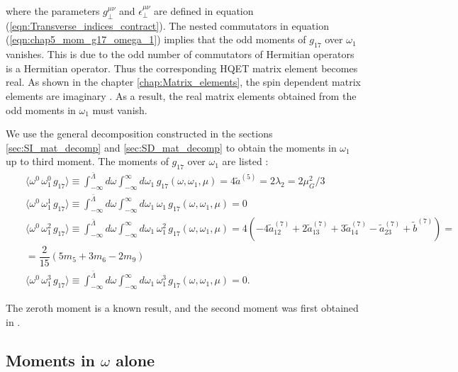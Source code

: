 where the parameters $g_\perp^{\mu\nu}$ and $\epsilon_\perp^{\mu\nu}$ are defined in equation (\ref{eqn:Transverse_indices_contract}). The nested commutators in equation (\ref{eqn:chap5_mom_g17_omega_1}) implies that the odd moments of $g_{17}$ over $\omega_1$ vanishes. This is due to the odd number of commutators of Hermitian operators is a Hermitian operator. Thus the corresponding HQET matrix element becomes real. As shown in the chapter \ref{chap:Matrix_elements}, the spin dependent matrix elements are imaginary \cite{Gunawardana:2017zix}. As a result, the real matrix elements obtained from the odd moments in $\omega_1$ must vanish.\par
We use the general decomposition constructed in the sections \ref{sec:SI_mat_decomp} and \ref{sec:SD_mat_decomp} to obtain the moments in $\omega_1$ up to third moment. The moments of $g_{17}$ over $\omega_1$ are listed :
\vspace{-0.3cm}
\begin{eqnarray}\label{eqn:chap5_w1moments}
&&\langle\omega^0\,\omega_1^0\,g_{17}\rangle\equiv\int^{\bar \Lambda}_{-\infty}d\omega\int^{\infty}_{-\infty}d\omega_1\,g_{17}(\omega,\omega_1,\mu)=4\tilde{a}^{(5)}=2\lambda_2=2\mu_G^2/3\nonumber\\
&&\langle\omega^0\,\omega_1^1\,g_{17}\rangle\equiv\int^{\bar \Lambda}_{-\infty}d\omega\int^{\infty}_{-\infty}d\omega_1\,\omega_1 \,g_{17}(\omega,\omega_1,\mu)=0\nonumber\\
&&\langle\omega^0\,\omega_1^2\,g_{17}\rangle\equiv\int^{\bar \Lambda}_{-\infty}d\omega\int^{\infty}_{-\infty}d\omega_1\,\omega_1^2 \,g_{17}(\omega,\omega_1,\mu)=4 \left(-4 \tilde{a}^{(7)}_{12} + 2 \tilde{a}^{(7)}_{13} + 3 \tilde{a}^{(7)}_{14} - \tilde{a}^{(7)}_{23} + \tilde{b}^{(7)}\right)=\nonumber\\
&&=\dfrac2{15} \left(5 m_5 + 3 m_6 - 2 m_9\right)\nonumber\\
&&\langle\omega^0\,\omega_1^3\,g_{17}\rangle\equiv\int^{\bar \Lambda}_{-\infty}d\omega\int^{\infty}_{-\infty}d\omega_1\,\omega_1^3 \,g_{17}(\omega,\omega_1,\mu)=0.
\end{eqnarray}  

The zeroth moment is a known result, and the second moment was first obtained in \cite{Gunawardana:2019gep}.

\subsection{Moments in $\omega$ alone}

